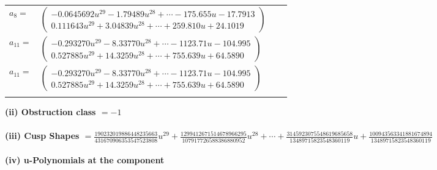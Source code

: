 \documentclass[1p]{elsarticle_modified}
\theoremstyle{definition}
\begin{document}
\begin{tabular}{m{7pt} m{180pt} m{7pt} m{180pt} }
\flushright $a_{8}=$&$\begin{pmatrix}-0.0645692 u^{29}-1.79489 u^{28}+\cdots-175.655 u-17.7913\\0.111643 u^{29}+3.04839 u^{28}+\cdots+259.810 u+24.1019\end{pmatrix}$ \\
\flushright $a_{11}=$&$\begin{pmatrix}-0.293270 u^{29}-8.33770 u^{28}+\cdots-1123.71 u-104.995\\0.527885 u^{29}+14.3259 u^{28}+\cdots+755.639 u+64.5890\end{pmatrix}$\\ \flushright $a_{11}=$&$\begin{pmatrix}-0.293270 u^{29}-8.33770 u^{28}+\cdots-1123.71 u-104.995\\0.527885 u^{29}+14.3259 u^{28}+\cdots+755.639 u+64.5890\end{pmatrix}$\\&\end{tabular}
\flushleft \textbf{(ii) Obstruction class $= -1$}\\~\\
\flushleft \textbf{(iii) Cusp Shapes $= \frac{190232019886448235663}{431670906353547523808} u^{29}+\frac{1299412671514678966295}{107917726588386880952} u^{28}+\cdots+\frac{3145923075548619685658}{13489715823548360119} u+\frac{100943563341881674894}{13489715823548360119}$}\\~\\
\newpage\renewcommand{\arraystretch}{1}
\flushleft \textbf{(iv) u-Polynomials at the component}\newline \\
\end{document}
